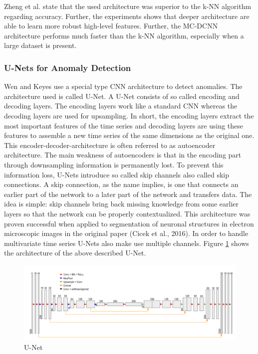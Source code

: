 Zheng et al. state that the used architecture was superior to the k-NN algorithm regarding accuracy. Further, the experiments shows that deeper architecture are able to learn more robust high-level features. Further, the MC-DCNN architecture performs much faster than the k-NN algorithm, especially when a large dataset is present. 

\subsubsection{U-Nets for Anomaly Detection}
Wen and Keyes \parencite*{Wen2019} use a special type CNN architecture to detect anomalies. The architecture used is called U-Net. A U-Net consists of so called encoding and decoding layers. The encoding layers work like a standard CNN whereas the decoding layers are used for upsampling. In short, the encoding layers extract the most important features of the time series and decoding layers are using these features to assemble a new time series of the same dimensions as the original one. This encoder-decoder-architecture is often referred to as autoencoder architecture. The main weakness of autoencoders is that in the encoding part through downsampling information is permanently lost. To prevent this information loss, U-Nets introduce so called skip channels also called skip connections. A skip connection, as the name implies, is one that connects an earlier part of the network to a later part of the network and transfers data. The idea is simple: skip channels bring back missing knowledge from some earlier layers so that the network can be properly contextualized. This architecture was proven successful when applied to segmentation of neuronal structures in electron microscopic images in the original paper (Cicek et al., 2016). In order to handle multivariate time series U-Nets also make use multiple channels. Figure \ref{fig:U-Net} shows the architecture of the above described U-Net.

\begin{figure}[h]
	\centering
	\includegraphics[scale=0.32]{Figures/U-Net}
	\decoRule
	\caption[U-Net]{U-Net \parencite{}}
	\label{fig:U-Net}
\end{figure}

